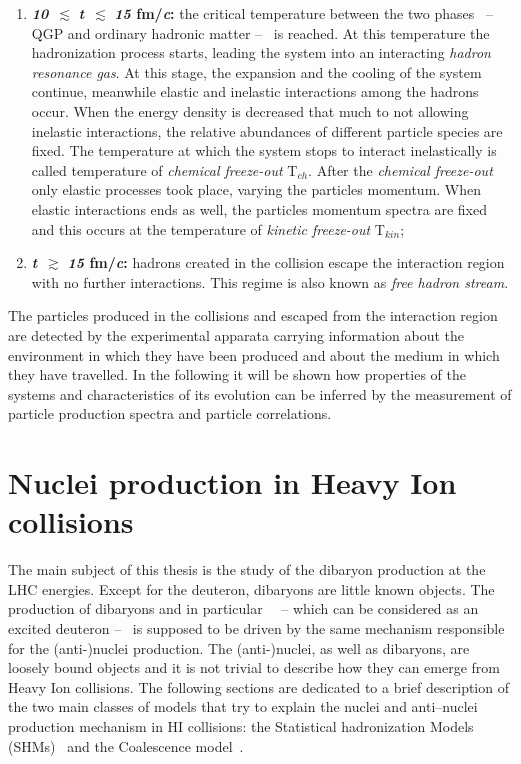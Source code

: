 \begin{enumerate}
    \item \textbf{\textit{10}} $\, \pmb{\lesssim}$ \textbf{\textit{t}} $\, \pmb{\lesssim}$ \textbf{\textit{15} fm/\textit{c}:}
            the critical temperature between the two phases \ -- QGP and ordinary hadronic matter -- \ is reached.
            At this temperature the hadronization process starts, leading the system into an interacting
            \textit{hadron resonance gas}. At this stage, the expansion and the cooling of the system continue, 
            meanwhile elastic and inelastic interactions among the hadrons occur. 
            When the energy density is decreased that much to not allowing inelastic interactions, the relative 
            abundances of different particle species are fixed. The temperature at which the system stops to 
            interact inelastically is called temperature of \textit{chemical freeze-out} T$_{ch}$. After the
            \textit{chemical freeze-out} only elastic processes took place, varying the particles momentum.
            When elastic interactions ends as well, the particles momentum spectra are fixed and this occurs
            at the temperature of \textit{kinetic freeze-out} T$_{kin}$;

    \item \textbf{\textit{t}} $\, \pmb{\gtrsim}$ \textbf{\textit{15} fm/\textit{c}:} hadrons created in 
            the collision escape the interaction region with no further interactions. This regime is 
            also known as \textit{free hadron stream}.
\end{enumerate}

The particles produced in the collisions and escaped from the interaction region are detected by 
the experimental apparata carrying information about the environment in 
which they have been produced and about the medium in which they have travelled. 
In the following it will be shown how properties of the systems and characteristics of its 
evolution can be inferred by the measurement of particle production spectra and particle correlations.

%
%
\section{Nuclei production in Heavy Ion collisions} \label{sec:1.4}

The main subject of this thesis is the study of the \dst dibaryon production at the LHC energies.
Except for the deuteron, dibaryons are little known objects.
The production of dibaryons and in particular \dst \ \ -- which can be considered as an excited deuteron -- \ is supposed to be driven by the same mechanism responsible for the (anti-)nuclei production.
The (anti-)nuclei, as well as dibaryons, are loosely bound objects and it is not trivial to describe how
they can emerge from Heavy Ion collisions. 
The following sections are dedicated to a brief description of the two main classes of models
that try to explain the nuclei and anti–nuclei production mechanism in HI collisions: the Statistical 
hadronization Models (SHMs)~\cite{thermalmodel} and the Coalescence model~\cite{deuprod}.

